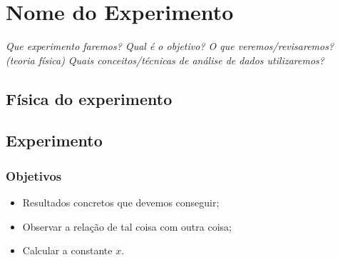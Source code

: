 \chapter{Nome do Experimento} %
\label{Chap:NomeDoExp}        %

\begin{fullwidth}\it
	Que experimento faremos?
	Qual é o objetivo?
	O que veremos/revisaremos? (teoria física)
	Quais conceitos/técnicas de análise de dados utilizaremos?
\end{fullwidth}

\section{Física do experimento}


\section{Experimento}

\subsection{Objetivos}

\begin{itemize}
	\item Resultados concretos que devemos conseguir;
	\item Observar a relação de tal coisa com outra coisa;
	\item Calcular a constante $x$.
\end{itemize}

